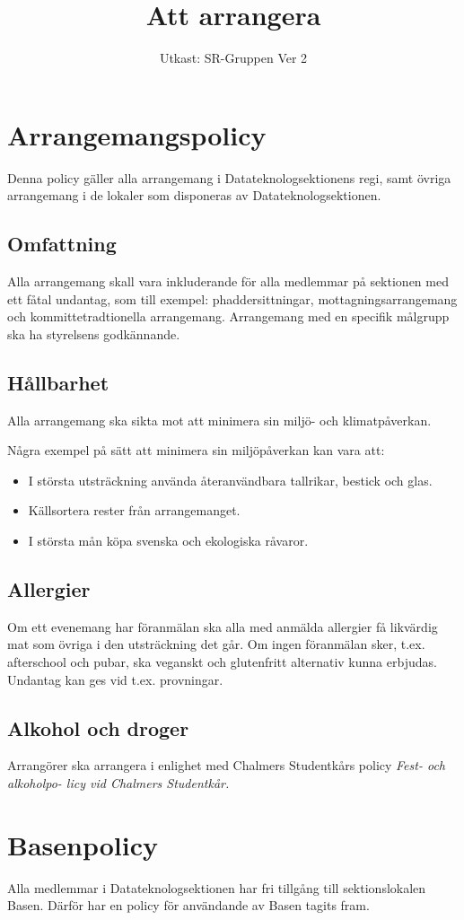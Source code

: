 \documentclass[a4paper]{dtek}
\title{Att arrangera}
\date{Utkast: SR-Gruppen Ver 2}
\begin{document}
\section{Arrangemangspolicy}
Denna policy gäller alla arrangemang i Datateknologsektionens regi, samt övriga arrangemang i de lokaler som disponeras av Datateknologsektionen.

\subsection{Omfattning}
Alla arrangemang skall vara inkluderande för alla medlemmar på sektionen med ett fåtal undantag, som till exempel: phaddersittningar, mottagningsarrangemang och kommittetradtionella arrangemang. Arrangemang med en specifik målgrupp ska ha styrelsens godkännande.

\subsection{Hållbarhet}
Alla arrangemang ska sikta mot att minimera sin miljö- och klimatpåverkan.

Några exempel på sätt att minimera sin miljöpåverkan kan vara att:
\begin{itemize}
    \item I största utsträckning använda återanvändbara tallrikar, bestick och glas.
    \item Källsortera rester från arrangemanget.
    \item I största mån köpa svenska och ekologiska råvaror.
\end{itemize}

\subsection{Allergier}
Om ett evenemang har föranmälan ska alla med anmälda allergier få likvärdig mat som övriga i den utsträckning det går. Om ingen föranmälan sker, t.ex. afterschool och pubar, ska veganskt och glutenfritt alternativ kunna erbjudas. Undantag kan ges vid t.ex. provningar.

\subsection{Alkohol och droger}
Arrangörer ska arrangera i enlighet med Chalmers Studentkårs policy \textit{Fest- och alkoholpo-
licy vid Chalmers Studentkår.}

\section{Basenpolicy}
Alla medlemmar i Datateknologsektionen har fri tillgång till sektionslokalen Basen. Därför har en policy för användande av Basen tagits fram.
\end{document}
